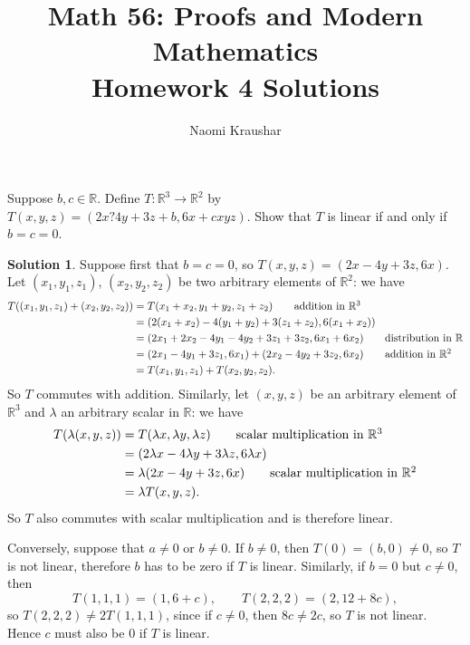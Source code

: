 \documentclass[12pt]{article}
\theoremstyle{definition}
\theoremstyle{definition}
\newtheorem*{soln}{Solution}
\newcommand{\R}{\mathbb{R}}
\begin{document}
\title{Math 56: Proofs and Modern Mathematics\\ Homework 4 Solutions}
\author{Naomi Kraushar}
\maketitle


\begin{prob}[Axler 3.A.1]
Suppose $b,c\in\R$. Define $T:\R^3\to\R^2$ by $T(x,y,z)=(2x?4y+3z+b,6x+cxyz)$. Show that $T$ is linear if and only if $b=c=0$.
\end{prob}

\begin{soln}
Suppose first that $b=c=0$, so $T(x,y,z)=(2x-4y+3z,6x)$. Let $(x_1,y_1,z_1)$, $(x_2,y_2,z_2)$ be two arbitrary elements of $\R^2$: we have
\begin{align*}
T((x_1,y_1,z_1)+(x_2,y_2,z_2)) &= T(x_1+x_2,y_1+y_2,z_1+z_2) \tag*{addition in $\R^3$}\\
&= (2(x_1+x_2)-4(y_1+y_2)+3(z_1+z_2),6(x_1+x_2)) \\
&= (2x_1+2x_2-4y_1-4y_2+3z_1+3z_2,6x_1+6x_2) \tag*{distribution in $\R$}\\
&= (2x_1-4y_1+3z_1,6x_1)+(2x_2-4y_2+3z_2,6x_2) \tag*{addition in $\R^2$}\\
&= T(x_1,y_1,z_1)+T(x_2,y_2,z_2).
\end{align*}
So $T$ commutes with addition. Similarly, let $(x,y,z)$ be an arbitrary element of $\R^3$ and $\lambda$ an arbitrary scalar in $\R$: we have
\begin{align*}
T(\lambda(x,y,z)) &= T(\lambda x,\lambda y,\lambda z) \tag*{scalar multiplication in $\R^3$}\\
&= (2\lambda x-4\lambda y+3\lambda z,6\lambda x) \\
&= \lambda (2x-4y+3z,6x) \tag*{scalar multiplication in $\R^2$}\\
&= \lambda T(x,y,z).
\end{align*}
So $T$ also commutes with scalar multiplication and is therefore linear.

Conversely, suppose that $a\neq 0$ or $b\neq 0$. If $b\neq 0$, then $T(0)=(b,0)\neq 0$, so $T$ is not linear, therefore $b$ has to be zero if $T$ is linear. Similarly, if $b=0$ but $c\neq 0$, then 
\[T(1,1,1)=(1,6+c), \qquad T(2,2,2)=(2,12+8c),\]
so $T(2,2,2)\neq 2T(1,1,1)$, since if $c\neq 0$, then $8c\neq 2c$, so $T$ is not linear. Hence $c$ must also be $0$ if $T$ is linear.
\end{soln}
\end{document}
